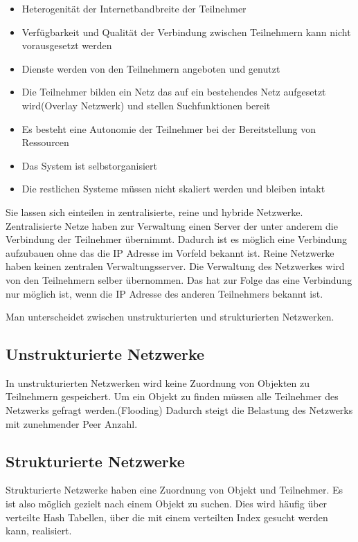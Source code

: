 \begin{itemize}
  \item Heterogenität der Internetbandbreite der Teilnehmer
  \item Verfügbarkeit und Qualität der Verbindung zwischen Teilnehmern kann nicht vorausgesetzt werden
  \item Dienste werden von den Teilnehmern angeboten und genutzt
  \item Die Teilnehmer bilden ein Netz das auf ein bestehendes Netz aufgesetzt wird(Overlay Netzwerk) und stellen Suchfunktionen bereit
  \item Es besteht eine Autonomie der Teilnehmer bei der Bereitstellung von Ressourcen
  \item Das System ist selbstorganisiert
  \item Die restlichen Systeme müssen nicht skaliert werden und bleiben intakt
\end{itemize}
Sie lassen sich einteilen in zentralisierte, reine und hybride \pTp Netzwerke. Zentralisierte Netze haben zur Verwaltung einen Server der unter anderem die Verbindung der Teilnehmer übernimmt. Dadurch ist es möglich eine Verbindung aufzubauen ohne das die IP Adresse im Vorfeld bekannt ist. Reine \pTp Netzwerke haben keinen zentralen Verwaltungsserver. Die Verwaltung des Netzwerkes wird von den Teilnehmern selber übernommen. Das hat zur Folge das eine Verbindung nur möglich ist, wenn die IP Adresse des anderen Teilnehmers bekannt ist. 

Man unterscheidet zwischen unstrukturierten und strukturierten \pTp Netzwerken. 

\subsection{Unstrukturierte \pTp Netzwerke}
In unstrukturierten \pTp Netzwerken wird keine Zuordnung von Objekten zu Teilnehmern gespeichert. Um ein Objekt zu finden müssen alle Teilnehmer des Netzwerks gefragt werden.(Flooding) Dadurch steigt die Belastung des Netzwerks mit zunehmender Peer Anzahl.

\subsection{Strukturierte \pTp Netzwerke}
Strukturierte \pTp Netzwerke haben eine Zuordnung von Objekt und Teilnehmer. Es ist also möglich gezielt nach einem Objekt zu suchen. Dies wird häufig über verteilte Hash Tabellen, über die mit einem verteilten Index gesucht werden kann, realisiert.

